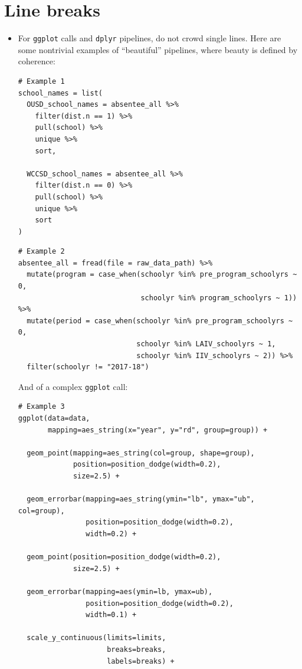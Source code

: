 \documentclass[
]{book}
\begin{document}
\section{Line breaks}\label{line-breaks}

\begin{itemize}
\item
  For \texttt{ggplot} calls and \texttt{dplyr} pipelines, do not crowd single lines. Here are some nontrivial examples of ``beautiful'' pipelines, where beauty is defined by coherence:

\begin{verbatim}
# Example 1
school_names = list(
  OUSD_school_names = absentee_all %>%
    filter(dist.n == 1) %>%
    pull(school) %>%
    unique %>%
    sort,

  WCCSD_school_names = absentee_all %>%
    filter(dist.n == 0) %>%
    pull(school) %>%
    unique %>%
    sort
)
\end{verbatim}

\begin{verbatim}
# Example 2
absentee_all = fread(file = raw_data_path) %>%
  mutate(program = case_when(schoolyr %in% pre_program_schoolyrs ~ 0,
                             schoolyr %in% program_schoolyrs ~ 1)) %>%
  mutate(period = case_when(schoolyr %in% pre_program_schoolyrs ~ 0,
                            schoolyr %in% LAIV_schoolyrs ~ 1,
                            schoolyr %in% IIV_schoolyrs ~ 2)) %>%
  filter(schoolyr != "2017-18")
\end{verbatim}

  And of a complex \texttt{ggplot} call:

\begin{verbatim}
# Example 3
ggplot(data=data,
       mapping=aes_string(x="year", y="rd", group=group)) +

  geom_point(mapping=aes_string(col=group, shape=group),
             position=position_dodge(width=0.2),
             size=2.5) +

  geom_errorbar(mapping=aes_string(ymin="lb", ymax="ub", col=group),
                position=position_dodge(width=0.2),
                width=0.2) +

  geom_point(position=position_dodge(width=0.2),
             size=2.5) +

  geom_errorbar(mapping=aes(ymin=lb, ymax=ub),
                position=position_dodge(width=0.2),
                width=0.1) +

  scale_y_continuous(limits=limits,
                     breaks=breaks,
                     labels=breaks) +


\end{verbatim}
\end{itemize}
\end{document}
